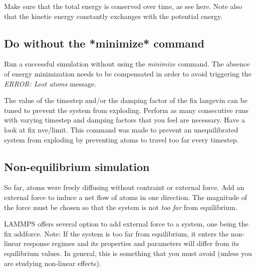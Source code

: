 \begin{tcolorbox}[colback=mylightblue!5!white,colframe=mylightblue!75!black,title=Expected output]
Make sure that the total energy is conserved over time, as see here. Note also 
that the kinetic energy constantly exchanges with the potential energy.
\end{tcolorbox}

\noindent \subsection{Do without the *minimize* command}

Run a successful simulation without using the \textit{minimize} command.
The absence of energy minimization needs to be compensated
in order to avoid triggering the \textit{ERROR: Lost atoms} message.

\begin{tcolorbox}[colback=mylightblue!5!white,colframe=mylightblue!75!black,title=Hints]
The value of the timestep and/or the damping factor of the fix langevin
can be tuned to prevent the system from exploding.
Perform as many consecutive runs with varying timestep and damping
factors that you feel are necessary.
Have a look at fix nve/limit. This command was
made to prevent an unequilibrated system from exploding
by preventing atoms to travel too far every timestep.
\end{tcolorbox}

\noindent \subsection{Non-equilibrium simulation}

So far, atoms were freely diffusing without contraint or external force.
Add an external force to induce a net flow of atoms in one
direction. The magnitude of the force must be chosen so
that the system is not \textit{too far} from equilibrium.

\begin{tcolorbox}[colback=mylightblue!5!white,colframe=mylightblue!75!black,title=Hints]
LAMMPS offers several option to add external force to a system, one 
being the fix addforce.
Note: If the system is too far from equilibrium, it enters the non-linear response 
regimes and its properties and parameters will differ from its equilibrium values.
In general, this is something that you must avoid (unless you are studying
non-linear effects). 
\end{tcolorbox}

